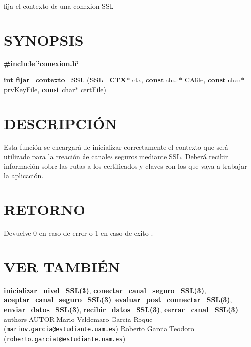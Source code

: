fija el contexto de una conexion S\-S\-L\hypertarget{cerrar_canal__s_s_l_SYNOPSIS}{}\section{S\-Y\-N\-O\-P\-S\-I\-S}\label{cerrar_canal__s_s_l_SYNOPSIS}
{\bfseries \#include} {\bfseries \char`\"{}conexion.\-h\char`\"{}} 

{\bfseries int} {\bfseries fijar\-\_\-contexto\-\_\-\-S\-S\-L} {\bfseries }({\bfseries S\-S\-L\-\_\-\-C\-T\-X$\ast$} ctx, {\bfseries const} char$\ast$ C\-Afile, {\bfseries const} char$\ast$ prv\-Key\-File, {\bfseries const} char$\ast$ cert\-File{\bfseries })\hypertarget{cerrar_canal__s_s_l_descripcion}{}\section{D\-E\-S\-C\-R\-I\-P\-C\-IÓ\-N}\label{cerrar_canal__s_s_l_descripcion}
Esta función se encargará de inicializar correctamente el contexto que será utilizado para la creación de canales seguros mediante S\-S\-L. Deberá recibir información sobre las rutas a los certificados y claves con los que vaya a trabajar la aplicación.\hypertarget{cerrar_canal__s_s_l_retorno}{}\section{R\-E\-T\-O\-R\-N\-O}\label{cerrar_canal__s_s_l_retorno}
Devuelve 0 en caso de error o 1 en caso de exito .\hypertarget{cerrar_canal__s_s_l_seealso}{}\section{V\-E\-R T\-A\-M\-B\-IÉ\-N}\label{cerrar_canal__s_s_l_seealso}
{\bfseries inicializar\-\_\-nivel\-\_\-\-S\-S\-L(3)}, {\bfseries conectar\-\_\-canal\-\_\-seguro\-\_\-\-S\-S\-L(3)}, {\bfseries aceptar\-\_\-canal\-\_\-seguro\-\_\-\-S\-S\-L(3)}, {\bfseries evaluar\-\_\-post\-\_\-connectar\-\_\-\-S\-S\-L(3)}, {\bfseries enviar\-\_\-datos\-\_\-\-S\-S\-L(3)}, {\bfseries recibir\-\_\-datos\-\_\-\-S\-S\-L(3)}, {\bfseries cerrar\-\_\-canal\-\_\-\-S\-S\-L(3)} {\bfseries }  authors A\-U\-T\-O\-R Mario Valdemaro Garcia Roque (\href{mailto:mariov.garcia@estudiante.uam.es}{\tt mariov.\-garcia@estudiante.\-uam.\-es}) Roberto Garcia Teodoro (\href{mailto:roberto.garciat@estudiante.uam.es}{\tt roberto.\-garciat@estudiante.\-uam.\-es}) 